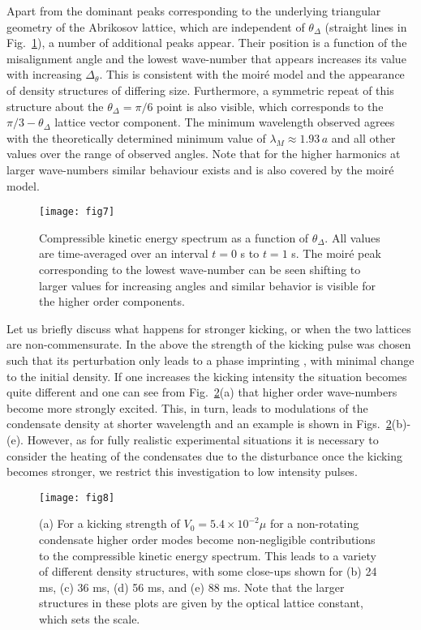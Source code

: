     Apart from the dominant peaks corresponding to the underlying triangular geometry of the Abrikosov lattice, which are independent of $\theta_\Delta$ (straight lines in Fig.~\ref{fig:dtheta_kspec}), a number of additional peaks appear. Their position is a function of the misalignment angle and the lowest wave-number that appears increases its value with increasing $\Delta_\theta$. This is consistent with the moir\'e model and the appearance of density structures of differing size.
    Furthermore, a symmetric repeat of this structure about the $\theta_\Delta=\pi/6$ point is also visible, which corresponds to the $\pi/3 - \theta_\Delta$ lattice vector component. The minimum wavelength observed agrees with the theoretically determined minimum value of $\lambda_M\approx 1.93\,a$ and all other values over the range of observed angles. Note that for the higher harmonics at larger wave-numbers similar behaviour exists and is also covered by the moir\'e model.
    		\begin{figure}[tb]
    			\texttt{[image: fig7]}
    			\caption{Compressible kinetic energy spectrum as a function of $\theta_\Delta$. All values are time-averaged over an interval $t=0$ s to $t=1$ s. The moir\'e peak corresponding to the lowest wave-number can be seen shifting to larger values for increasing angles and similar behavior is visible for the higher order components.}
    			\label{fig:dtheta_kspec}
    		\end{figure}


    Let us briefly discuss what happens for stronger kicking, or when the two lattices are non-commensurate.
    In the above the strength of the kicking pulse was chosen such that its perturbation only leads to a phase imprinting \cite{Vtx:Dobrek_pra_1999,BEC:Denschlag_science_2000}, with minimal change to the initial density. If one increases the kicking intensity the situation becomes quite different and one can see from Fig.~\ref{fig:kickp20k}(a) that higher order wave-numbers become more strongly excited. This, in turn, leads to modulations of the condensate density at shorter wavelength and an example is shown in Figs.~\ref{fig:kickp20k}(b)-(e). However, as for fully realistic experimental situations it is necessary to consider the heating of the condensates due to the disturbance once the kicking becomes stronger, we restrict this investigation to low intensity pulses.

    \begin{figure}[tb]
    			\texttt{[image: fig8]}
    			\caption{(a) For a kicking strength of $V_0 = 5.4\times10^{-2}\mu$ for a non-rotating condensate higher order modes become non-negligible contributions to the compressible kinetic energy spectrum. This leads to a variety of different density structures, with some close-ups shown for (b) 24 ms, (c) 36 ms, (d) 56 ms, and (e) 88 ms. Note that the larger structures in these plots are given by the optical lattice constant, which sets the scale.}
    			\label{fig:kickp20k}
    		\end{figure}

